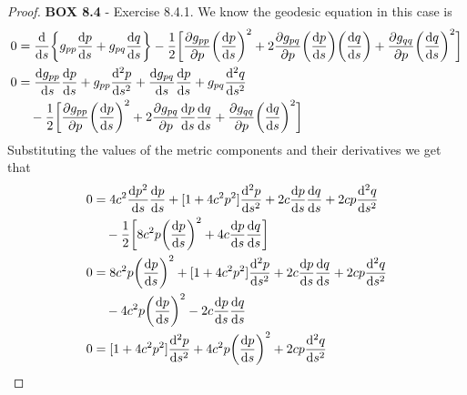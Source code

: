 \documentclass[11pt]{article}
\theoremstyle{definition}
\begin{document}
\begin{proof}{\textbf{BOX 8.4} - Exercise 8.4.1.}
    We know the geodesic equation in this case is
    \begin{align*}
        0 &= \derivative{}{s}\bigg\{
            g_{pp}\derivative{p}{s} + g_{pq}\derivative{q}{s}
        \bigg\} - \frac{1}{2}\bigg[
            \partialderivative{g_{pp}}{p} \bigg(\derivative{p}{s}\bigg)^2
            + 2 \partialderivative{g_{pq}}{p}\bigg(\derivative{p}{s}\bigg)
            \bigg(\derivative{q}{s}\bigg)
            + \partialderivative{g_{qq}}{p} \bigg(\derivative{q}{s}\bigg)^2
        \bigg]\\
        0 &= \derivative{g_{pp}}{s}\derivative{p}{s}
            + g_{pp}\derivative[2]{p}{s}
            + \derivative{g_{pq}}{s}\derivative{p}{s}
            + g_{pq}\derivative[2]{q}{s}\\
        &\quad- \frac{1}{2}\bigg[
            \partialderivative{g_{pp}}{p} \bigg(\derivative{p}{s}\bigg)^2
            + 2 \partialderivative{g_{pq}}{p}\derivative{p}{s}\derivative{q}{s}
            + \partialderivative{g_{qq}}{p} \bigg(\derivative{q}{s}\bigg)^2
        \bigg]
    \end{align*}
    Substituting the values of the metric components and their derivatives
    we get that 
    \begin{align*}
        0 &= 4c^2\derivative{p^2}{s}\derivative{p}{s}
            + [1 + 4c^2p^2]\derivative[2]{p}{s}
            + 2c\derivative{p}{s}\derivative{q}{s}
            + 2cp\derivative[2]{q}{s}\\
        &\quad- \frac{1}{2}\bigg[
            8c^2p \bigg(\derivative{p}{s}\bigg)^2
            + 4c\derivative{p}{s}
            \derivative{q}{s}
        \bigg]\\
        0 &= 8c^2p\bigg(\derivative{p}{s}\bigg)^2
            + [1 + 4c^2p^2]\derivative[2]{p}{s}
            + 2c\derivative{p}{s}\derivative{q}{s}
            + 2cp\derivative[2]{q}{s}\\
        &\quad-
            4c^2p \bigg(\derivative{p}{s}\bigg)^2
            - 2c\derivative{p}{s}\derivative{q}{s}\\
        0 &= [1 + 4c^2p^2]\derivative[2]{p}{s}
            + 4c^2p\bigg(\derivative{p}{s}\bigg)^2
            + 2cp\derivative[2]{q}{s}\\
    \end{align*}
\end{proof}
\cleardoublepage
\end{document}
